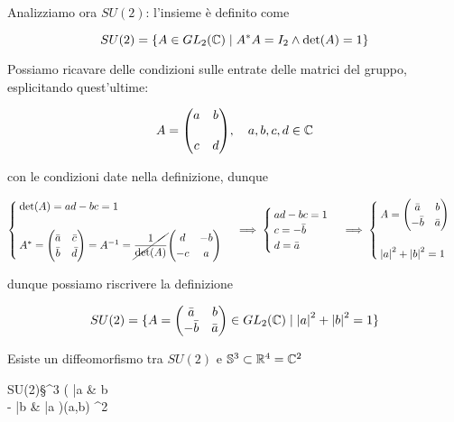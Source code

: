 Analizziamo ora $ SU(2) $: l'insieme è definito come

\begin{equation}
	SU(2) = \{ A \in GL_{2}(\mathbb{C}) \mid A^{*} A = I_{2} \wedge \det(A) = 1 \}
\end{equation}

Possiamo ricavare delle condizioni sulle entrate delle matrici del gruppo, esplicitando quest'ultime:

\begin{equation}
	A = \mqty( a & b \\\\ c & d ) \qcomma a,b,c,d \in \C
\end{equation}

con le condizioni date nella definizione, dunque

\begin{equation}
	\begin{cases}
		\det(A) = a d - b c = 1\\\\
		A^{*} = \mqty( \bar{a} & \bar{c} \\ \bar{b} & \bar{d} ) = A^{-1} = \cancel{\dfrac{1}{\det(A)}} \mqty( d & -b \\ -c & a )
	\end{cases}
	\implies%
	\begin{cases}
		a d - b c = 1\\
		c = - \bar{b}\\
		d = \bar{a}
	\end{cases}
	\implies%
	\begin{cases}
		A = \mqty( \bar{a} & b \\ - \bar{b} & \bar{a} )\\\\
		\abs{a}^{2} + \abs{b}^{2} = 1
	\end{cases}
\end{equation}

dunque possiamo riscrivere la definizione

\begin{equation}
	SU(2) = \{ A = \mqty( \bar{a} & b \\ - \bar{b} & \bar{a} ) \in GL_{2}(\C) \mid \abs{a}^{2} + \abs{b}^{2} = 1 \}
\end{equation}

Esiste un diffeomorfismo tra $ SU(2) $ e $ \mathbb{S}^{3} \subset \mathbb{R}^{4} = \mathbb{C}^{2} $

\map{\phi}%
	{SU(2)}{\S^{3}}%
	{\mqty( \bar{a} & b \\ - \bar{b} & \bar{a} )}{(a,b) \in \C^{2}}

